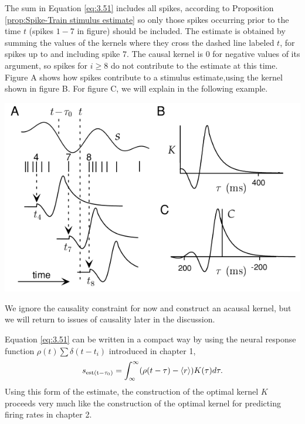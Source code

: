 \begin{exm}
  \label{exm:3_13ABC}
  The sum in Equation \ref{eq:3.51}
  includes all spikes, according to Proposition \ref{prop:Spike-Train stimulus estimate} so only those spikes occurring prior to
the time $t$ (spikes $1-7$ in figure) should be included. The estimate is
obtained by summing the values of the kernels where they cross the dashed line
labeled $t$, for spikes up to and including spike $7$. The causal kernel is $0$
for negative values of its argument, so spikes for $i\geq 8$ do not
contribute to the estimate at this time. Figure A shows how spikes
contribute to a stimulus estimate,using the kernel shown in figure
B. For figure C, we will explain in the following example.

  \begin{center}
 \includegraphics[scale = 0.4]{./png/3-13-A-B}
\end{center}

\end{exm}


\begin{asm}
  \label{asm:ignore the causality}
  We ignore the causality constraint for now and construct
  an acausal kernel, but we will return to issues of causality later in the discussion.
\end{asm}

\begin{prop}
 Equation \ref{eq:3.51} can be written
in a compact way by using the neural response function
$\rho(t)\sum\delta(t-t_{i})$ introduced in chapter 1,
\begin{equation}
  \label{eq:3.52}
  s_{\rm{est}(t-\tau_{0})}=\int_{\infty}^{\infty}(\rho(t-\tau)-\left\langle r \right\rangle)K(\tau)d\tau.
\end{equation}
Using this form of the estimate, the construction of the optimal kernel $K$
proceeds very much like the construction of the optimal kernel for predicting firing rates in chapter 2.
\end{prop}

